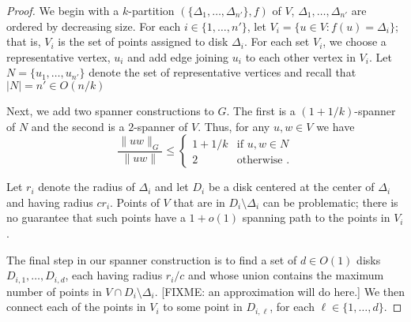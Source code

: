 \documentclass{patmorin}
\begin{document}
\begin{proof}
  We begin with a $k$-partition $(\{\Delta_1,\ldots,\Delta_{n'}\},f)$
  of $V$, $\Delta_1,\ldots,\Delta_{n'}$ are ordered by decreasing size.
  For each $i\in \{1,\ldots,n'\}$, let $V_i=\{u\in V :
  f(u)=\Delta_i\}$; that is, $V_i$ is the set of points assigned to
  disk $\Delta_i$.  For each set $V_i$, we choose a representative vertex,
  $u_i$ and add edge joining $u_i$ to each other vertex in $V_i$. Let
  $N=\{u_1,\ldots,u_{n'}\}$ denote the set of representative vertices
  and recall that $|N|=n'\in O(n/k)$

  Next, we add two spanner constructions to $G$.  The first is a
  $(1+1/k)$-spanner of $N$ and the second is a $2$-spanner of $V$.
  Thus, for any $u,w\in V$ we have
  \[
     \frac{\|uw\|_G}{\|uw\|} \le \begin{cases}
           1+1/k & \text{if $u,w\in N$} \\
           2 & \text{otherwise .}
         \end{cases}
  \]
  
  Let $r_i$ denote the radius of $\Delta_i$ and let $D_i$ be a disk
  centered at the center of $\Delta_i$ and having radius $cr_i$.
  Points of $V$ that are in $D_i\setminus \Delta_i$ can be problematic;
  there is no guarantee that such points have a $1+o(1)$ spanning path
  to the points in $V_i$.

  The final step in our spanner construction is to find a set of $d\in
  O(1)$ disks $D_{i,1},\ldots,D_{i,d}$, each having radius $r_i/c$ and
  whose union contains the maximum number of points in $V\cap D_i\setminus
  \Delta_i$.  [FIXME: an approximation will do here.]  We then connect
  each of the points in $V_i$ to some point in $D_{i,\ell}$, for each
  $\ell\in\{1,\ldots,d\}$.


\end{proof}
\end{document}
